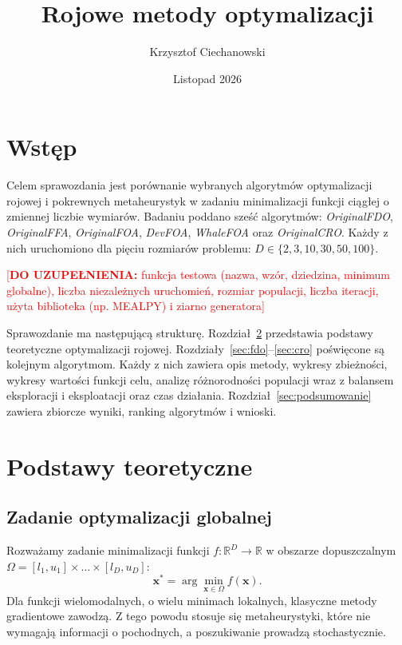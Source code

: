\documentclass[12pt,a4paper]{article}
\title{Rojowe metody optymalizacji}
\author{Krzysztof Ciechanowski}
\date{Listopad 2026}
\newcommand{\todo}[1]{\textcolor{red}{[\textbf{DO UZUPEŁNIENIA:} #1]}}
\begin{document}
\maketitle
\thispagestyle{empty}
\newpage
\tableofcontents
\newpage

\section{Wstęp}

Celem sprawozdania jest porównanie wybranych algorytmów optymalizacji rojowej
i pokrewnych metaheurystyk w zadaniu minimalizacji funkcji ciągłej o zmiennej
liczbie wymiarów. Badaniu poddano sześć algorytmów:
\textit{OriginalFDO}, \textit{OriginalFFA}, \textit{OriginalFOA},
\textit{DevFOA}, \textit{WhaleFOA} oraz \textit{OriginalCRO}.
Każdy z nich uruchomiono dla pięciu rozmiarów problemu:
$D \in \{2, 3, 10, 30, 50, 100\}$.

\todo{funkcja testowa (nazwa, wzór, dziedzina, minimum globalne), liczba
niezależnych uruchomień, rozmiar populacji, liczba iteracji, użyta biblioteka
(np. MEALPY) i ziarno generatora}

Sprawozdanie ma następującą strukturę. Rozdział~\ref{sec:teoria} przedstawia
podstawy teoretyczne optymalizacji rojowej. Rozdziały~\ref{sec:fdo}--\ref{sec:cro}
poświęcone są kolejnym algorytmom. Każdy z nich zawiera opis metody, wykresy
zbieżności, wykresy wartości funkcji celu, analizę różnorodności populacji
wraz z balansem eksploracji i eksploatacji oraz czas działania. Rozdział~\ref{sec:podsumowanie}
zawiera zbiorcze wyniki, ranking algorytmów i wnioski.

\section{Podstawy teoretyczne}\label{sec:teoria}

\subsection{Zadanie optymalizacji globalnej}

Rozważamy zadanie minimalizacji funkcji $f:\mathbb{R}^D \rightarrow \mathbb{R}$ w obszarze
dopuszczalnym $\Omega = [l_1,u_1]\times\dots\times[l_D,u_D]$:
\begin{equation}
    \mathbf{x}^{*} = \arg\min_{\mathbf{x}\in\Omega} f(\mathbf{x}).
\end{equation}
Dla funkcji wielomodalnych, o wielu minimach lokalnych, klasyczne metody
gradientowe zawodzą. Z tego powodu stosuje się metaheurystyki, które nie
wymagają informacji o pochodnych, a poszukiwanie prowadzą stochastycznie.
\end{document}
